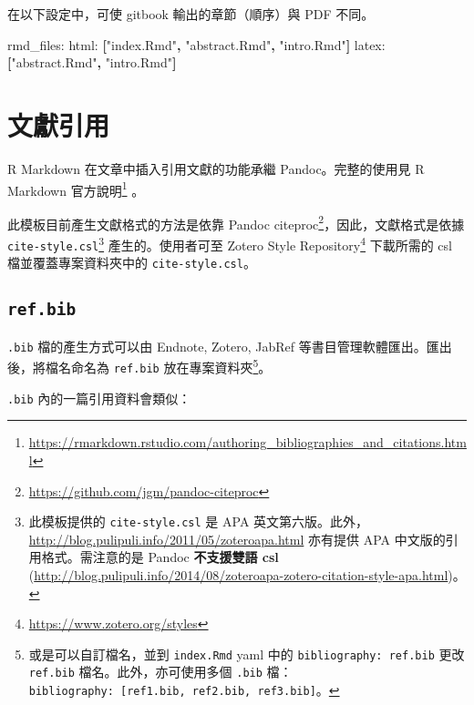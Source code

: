 \documentclass[oneside]{book}
\newenvironment{Shaded}{\begin{snugshade}}{\end{snugshade}}
\newcommand{\AttributeTok}[1]{\textcolor[rgb]{0.77,0.63,0.00}{#1}}
\newcommand{\FunctionTok}[1]{\textcolor[rgb]{0.00,0.00,0.00}{#1}}
\newcommand{\KeywordTok}[1]{\textcolor[rgb]{0.13,0.29,0.53}{\textbf{#1}}}
\newcommand{\StringTok}[1]{\textcolor[rgb]{0.31,0.60,0.02}{#1}}
\renewcommand{\href}[2]{#2\footnote{\url{#1}}}
\begin{document}
在以下設定中，可使 gitbook 輸出的章節（順序）與 PDF 不同。

\begin{Shaded}
\begin{Highlighting}[]
\FunctionTok{rmd_files:}
  \FunctionTok{html:}\AttributeTok{ }\KeywordTok{[}\StringTok{"index.Rmd"}\KeywordTok{,} \StringTok{"abstract.Rmd"}\KeywordTok{,} \StringTok{"intro.Rmd"}\KeywordTok{]}
  \FunctionTok{latex:}\AttributeTok{ }\KeywordTok{[}\StringTok{"abstract.Rmd"}\KeywordTok{,} \StringTok{"intro.Rmd"}\KeywordTok{]}
\end{Highlighting}
\end{Shaded}

\hypertarget{bib-cite}{%
\section{文獻引用}\label{bib-cite}}

R Markdown 在文章中插入引用文獻的功能承繼 Pandoc。完整的使用見 \href{https://rmarkdown.rstudio.com/authoring_bibliographies_and_citations.html}{R Markdown 官方說明} 。

此模板目前產生文獻格式的方法是依靠 \href{https://github.com/jgm/pandoc-citeproc}{Pandoc citeproc}，因此，文獻格式是依據 \texttt{cite-style.csl}\footnote{此模板提供的 \texttt{cite-style.csl} 是 APA 英文第六版。此外，\url{http://blog.pulipuli.info/2011/05/zoteroapa.html} 亦有提供 APA 中文版的引用格式。需注意的是 Pandoc \textbf{不支援雙語 csl} (\url{http://blog.pulipuli.info/2014/08/zoteroapa-zotero-citation-style-apa.html})。} 產生的。使用者可至 \href{https://www.zotero.org/styles}{Zotero Style Repository} 下載所需的 csl 檔並覆蓋專案資料夾中的 \texttt{cite-style.csl}。

\hypertarget{ref-bib}{%
\subsection{\texorpdfstring{\texttt{ref.bib}}{ref.bib}}\label{ref-bib}}

\texttt{.bib} 檔的產生方式可以由 Endnote, Zotero, JabRef 等書目管理軟體匯出。匯出後，將檔名命名為 \texttt{ref.bib} 放在專案資料夾\footnote{或是可以自訂檔名，並到 \texttt{index.Rmd} yaml 中的 \texttt{bibliography:\ ref.bib} 更改 \texttt{ref.bib} 檔名。此外，亦可使用多個 \texttt{.bib} 檔：\texttt{bibliography:\ {[}ref1.bib,\ ref2.bib,\ ref3.bib{]}}。}。

\texttt{.bib} 內的一篇引用資料會類似：
\end{document}
